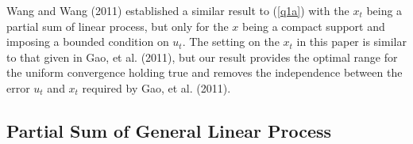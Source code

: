 \medskip
\begin{rem} Wang and Wang (2011) established a similar result to (\ref {q1a}) with the $x_t$ being a partial sum of linear process, but only for the $x$ being a compact support and imposing  a bounded condition on $u_t$. The setting on the $x_t$ in this paper is similar to that given in Gao, et al. (2011), but our result provides the optimal range
 for the uniform convergence holding true and removes  the independence between the error $u_t$ and $x_t$ required by Gao, et al. (2011).

\end{rem}

\subsection{Partial Sum of General Linear Process}


